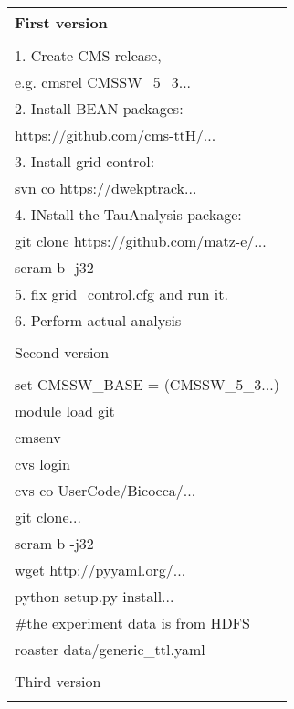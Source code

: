 \documentclass{article}
\begin{document}
\begin{table}
    \centering
    \begin{tabular}{|l|}
        \hline
        First version \\ \hline
        \\
        1. Create CMS release,\\
            \hspace{9pt} e.g. cmsrel CMSSW\_5\_3... \\
        2. Install BEAN packages: \\
            \hspace{9pt} https://github.com/cms-ttH/...\\
        3. Install grid-control: \\ 
            \hspace{9pt} svn co https://dwekptrack... \\
        4. INstall the TauAnalysis package: \\
           \hspace{9pt} git clone https://github.com/matz-e/... \\
           \hspace{9pt} scram b -j32 \\
        5. fix grid\_control.cfg and run it. \\
        6. Perform actual analysis \\ 
        \\ \hline
        Second version \\ \hline
        \\
        set CMSSW\_BASE = (CMSSW\_5\_3...) \\
        module load git \\        
        cmsenv \\ 
        cvs login \\
        cvs co UserCode/Bicocca/... \\
        git clone... \\
        scram b -j32 \\
        wget http://pyyaml.org/... \\
        python setup.py install... \\
        \#the experiment data is from HDFS \\
        roaster data/generic\_ttl.yaml \\ 
        \\ \hline
        Third version \\ \hline
        \\

\end{tabular}
\end{table}
\end{document}
